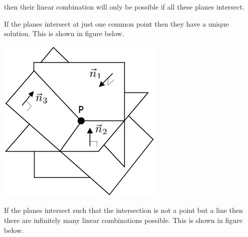 \documentclass[a4paper, 11pt]{article}
\begin{document}
\begin{enumerate}
	then their linear combination will only be possible if all these planes intersect.
 	
 	If the planes intersect at just one common point then they have a unique solution. This is shown in figure below.  \cite{three}
 	
 	\begin{center}
  	\includegraphics[width=\linewidth]{images/unique_solution_plane.png}
	\end{center}
 	
If the planes intersect such that the intersection is not a point but a line then there are infinitely many linear combinations possible. This is shown in figure below. \cite{six}
	

\end{enumerate}
\end{document}
